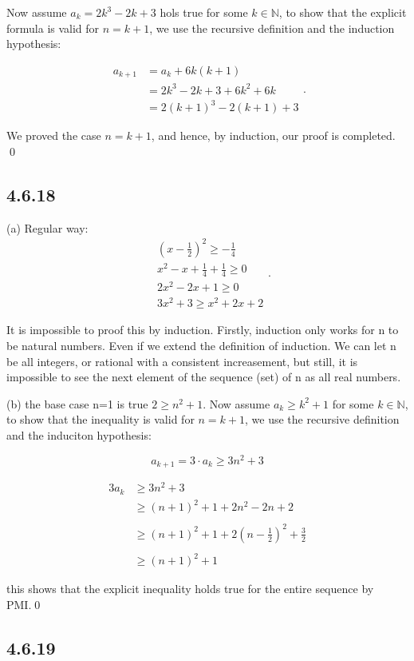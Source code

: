 \documentclass{article}
\begin{document}
Now assume $a_k=2k^3-2k+3$ hols true for some $k\in\mathbb{N}$, to show that the explicit formula is valid for $n=k+1$, we use the recursive definition and the induction hypothesis:

$$\begin{aligned}a_{k+1}&=a_{k}+6k(k+1)\\&=2k^3-2k+3+6k^2+6k\\&=2(k+1)^3-2(k+1)+3\end{aligned}.$$

We proved the case $n=k+1$, and hence, by induction, our proof is completed. \qed

\subsection*{4.6.18}

(a) Regular way: $$\begin{aligned}&(x-\frac12)^2\geq-\frac14\\&x^2-x+\frac14+\frac14\geq0\\&2x^2-2x+1\geq0\\&3x^2+3\geq x^2+2x+2\end{aligned}.$$

It is impossible to proof this by induction. Firstly, induction only works for n to be natural numbers. Even if we extend the definition of induction. We can let n be all integers, or rational with a consistent increasement, but still, it is impossible to see the next element of the sequence (set) of n as all real numbers.


(b) the base case n=1 is true $2\geq n^2+1$. Now assume $a_k\geq k^2+1$ for some $k\in\mathbb{N}$,  to show that the inequality is valid for $n=k+1$, we use the recursive definition and the induciton hypothesis:

$$a_{k+1}=3\cdot a_k \geq 3n^2+3$$

$$\begin{aligned}3a_{k}&\geq3n^{2}+3\\&\geq\left(n+1\right)^{2}+1+2n^{2}-2n+2\\\\&\geq\left(n+1\right)^{2}+1+2\left(n-\frac{1}{2}\right)^{2}+\frac{3}{2}\\\\&\geq\left(n+1\right)^{2}+1\end{aligned}$$

this shows that the explicit inequality holds true for the entire sequence by PMI.\qed

\subsection*{4.6.19}
\end{document}

